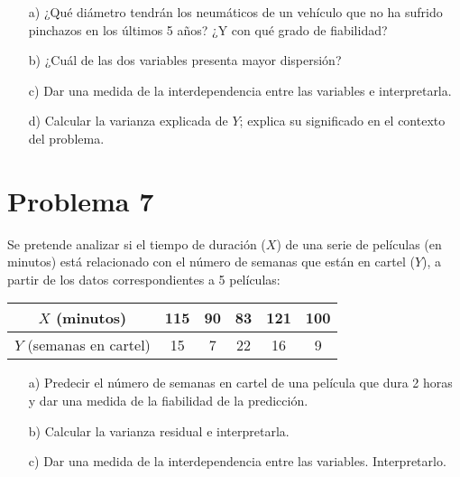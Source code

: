 \documentclass[fleqn]{article}
\begin{document}
	\begin{enumerate}
		\item[a)] ¿Qué diámetro tendrán los neumáticos de un vehículo que no ha sufrido pinchazos en los últimos 5 años? ¿Y con qué grado de fiabilidad?
		
		\item[b)] ¿Cuál de las dos variables presenta mayor dispersión?
		
		\item[c)] Dar una medida de la interdependencia entre las variables e interpretarla.
		
		\item[d)] Calcular la varianza explicada de \( Y \); explica su significado en el contexto del problema.
	\end{enumerate}
	\section{Problema 7}
	Se pretende analizar si el tiempo de duración (\( X \)) de una serie de películas (en minutos) está relacionado con el número de semanas que están en cartel (\( Y \)), a partir de los datos correspondientes a 5 películas:
	
	\begin{table}[h!]
		\centering
		\begin{tabular}{|c|c|c|c|c|c|}
			\hline
			\( X \) (minutos) & 115 & 90 & 83 & 121 & 100 \\ \hline
			\( Y \) (semanas en cartel) & 15 & 7 & 22 & 16 & 9 \\ \hline
		\end{tabular}
	\end{table}
	
	\begin{enumerate}
		\item[a)] Predecir el número de semanas en cartel de una película que dura 2 horas y dar una medida de la fiabilidad de la predicción.
		
		\item[b)] Calcular la varianza residual e interpretarla.
		
		\item[c)] Dar una medida de la interdependencia entre las variables. Interpretarlo.
	\end{enumerate}
\end{document}
